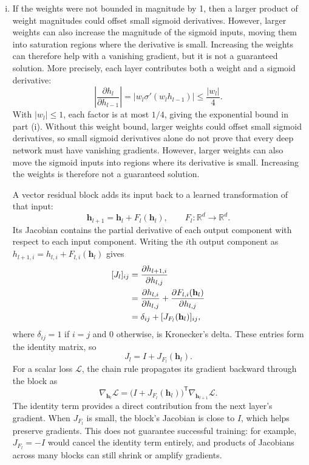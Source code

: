 \documentclass[12pt]{article}
\begin{document}
\begin{enumerate}
\begin{enumerate}[label=\textbf{\Alph*.}, leftmargin=*]
\begin{enumerate}[(i)]
    \item If the weights were not bounded in magnitude by 1, then a larger product of weight magnitudes could offset small sigmoid derivatives. However, larger weights can also increase the magnitude of the sigmoid inputs, moving them into saturation regions where the derivative is small. Increasing the weights can therefore help with a vanishing gradient, but it is not a guaranteed solution. More precisely, each layer contributes both a weight and a sigmoid derivative:
    \[
        \left|\frac{\partial h_l}{\partial h_{l-1}}\right|
        = \left|w_l\sigma'(w_lh_{l-1})\right|
        \leq \frac{|w_l|}{4}.
    \]
    With $|w_l|\leq 1$, each factor is at most $1/4$, giving the exponential bound in part (i). Without this weight bound, larger weights could offset small sigmoid derivatives, so small sigmoid derivatives alone do not prove that every deep network must have vanishing gradients. However, larger weights can also move the sigmoid inputs into regions where its derivative is small. Increasing the weights is therefore not a guaranteed solution.

    A vector residual block adds its input back to a learned transformation of that input:
    \[
        \mathbf h_{l+1}=\mathbf h_l+F_l(\mathbf h_l),
        \qquad F_l:\mathbb R^d\to\mathbb R^d.
    \]
    Its Jacobian contains the partial derivative of each output component with respect to each input component. Writing the $i$th output component as $h_{l+1,i}=h_{l,i}+F_{l,i}(\mathbf h_l)$ gives
    \[
    \begin{aligned}
        \relax[J_l]_{ij}
        &=\frac{\partial h_{l+1,i}}{\partial h_{l,j}} \\
        &=\frac{\partial h_{l,i}}{\partial h_{l,j}}
          +\frac{\partial F_{l,i}(\mathbf h_l)}{\partial h_{l,j}} \\
        &=\delta_{ij}+[J_{F_l}(\mathbf h_l)]_{ij},
    \end{aligned}
    \]
    where $\delta_{ij}=1$ if $i=j$ and $0$ otherwise, is Kronecker's delta. These entries form the identity matrix, so
    \[
        \boxed{J_l=I+J_{F_l}(\mathbf h_l)}.
    \]
    For a scalar loss $\mathcal L$, the chain rule propagates its gradient backward through the block as
    \[
        \nabla_{\mathbf h_l}\mathcal L
        =\bigl(I+J_{F_l}(\mathbf h_l)\bigr)^{\mathsf T}
         \nabla_{\mathbf h_{l+1}}\mathcal L.
    \]
    The identity term provides a direct contribution from the next layer's gradient. When $J_{F_l}$ is small, the block's Jacobian is close to $I$, which helps preserve gradients. This does not guarantee successful training: for example, $J_{F_l}=-I$ would cancel the identity term entirely, and products of Jacobians across many blocks can still shrink or amplify gradients.
   \end{enumerate} 


\end{enumerate}
\end{enumerate}
\end{document}
